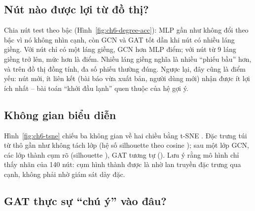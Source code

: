
\subsection{Nút nào được lợi từ đồ thị?}


Chia nút test theo bậc (Hình~\ref{fig:ch6-degree-acc}): MLP gần như không đổi theo bậc vì nó không nhìn cạnh, còn GCN và
GAT tốt dần khi nút có nhiều láng giềng. Với nút chỉ có một láng giềng, GCN hơn MLP 
điểm; với nút từ 9 láng giềng trở lên, mức hơn là  điểm. Nhiều láng giềng nghĩa là
nhiều ``phiếu bầu'' hơn, và trên đồ thị đồng tính, đa số phiếu thường đúng. Ngược lại, đây cũng là điểm yếu: nút mới, ít
liên kết (bài báo vừa xuất bản, người dùng mới) nhận được ít lợi ích nhất -- bài toán ``khởi đầu lạnh'' quen thuộc của hệ
gợi ý.

\subsection{Không gian biểu diễn}


Hình~\ref{fig:ch6-tsne} chiếu ba không gian về hai chiều bằng t-SNE \cite{ch6:maaten2008}. Đặc trưng túi từ thô gần như
không tách lớp (hệ số silhouette theo cosine ); sau một lớp GCN, các lớp thành cụm rõ
(silhouette ), GAT tương tự (). Lưu ý rằng mô hình
chỉ thấy nhãn của 140 nút: cụm hình thành được là nhờ lan truyền đặc trưng qua cạnh, không phải nhờ giám sát dày đặc.

\subsection{GAT thực sự ``chú ý'' vào đâu?}
\label{sec:gnn-exp-attn}


